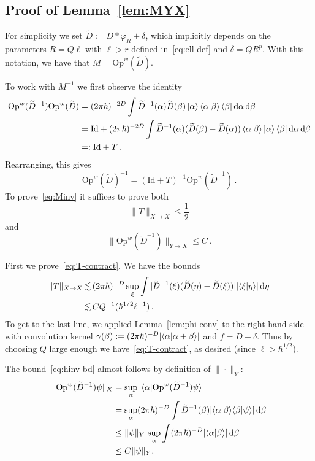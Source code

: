 \documentclass[11pt]{amsart}
\def\Op{\mathrm{Op}}
\def\Id{\mathrm{Id}}
\newcommand{\diff}{\mathop{}\!\mathrm{d}}
\def\lsim{{\,\lesssim\,}}
\def\bra#1{\mathinner{\langle{#1}|}}
\def\ket#1{\mathinner{|{#1}\rangle}}
\def\braket#1{\mathinner{\langle{#1}\rangle}}
\def\Braket#1{\!\mathinner{\langle{#1}\rangle}\!}
\numberwithin{equation}{section}
\begin{document}
\subsection{Proof of Lemma~\ref{lem:MYX}}
\label{sec:proofM}
For simplicity we set $\widetilde{D} := D\ast\varphi_{R} + \delta$, which implicitly depends on the
parameters $R=Q\ell$ with $\ell > r$ defined in~\eqref{eq:ell-def}
and $\delta = QR^p$.  With this notation, we have that $M = \Op^w(\widetilde{D})$.

To work with $M^{-1}$ we first observe the identity
\begin{align*}
\Op^w(\widetilde{D}^{-1})\Op^w(\widetilde{D})
&= (2\pi\hbar)^{-2D}\int \widetilde{D}^{-1}(\alpha) \widetilde{D}(\beta) \ket{\alpha}\braket{\alpha|\beta}\bra{\beta} \diff \alpha\diff\beta \\
&= \Id + (2\pi \hbar)^{-2D} \int \widetilde{D}^{-1}(\alpha) (\widetilde{D}(\beta)-\widetilde{D}(\alpha)) \braket{\alpha|\beta} \ket{\alpha}\bra{\beta}\diff\alpha\diff\beta \\
&=: \Id + T\,.
\end{align*}
Rearranging, this gives
\[
\Op^w(\widetilde{D})^{-1} = (\Id+T)^{-1}  \Op^w(\widetilde{D}^{-1})\,.
\]
To prove~\eqref{eq:Minv} it suffices to prove both
\begin{equation}
\label{eq:T-contract}
\|T\|_{X\to X} \leq \frac12
\end{equation}
and
\begin{equation}
\label{eq:hinv-bd}
\|\Op^w(\widetilde{D}^{-1})\|_{Y\to X} \leq C\,.
\end{equation}

First we prove~\eqref{eq:T-contract}.  We have the bounds
\begin{align*}
\|T\|_{X\to X}
&\lsim (2\pi\hbar)^{-D} \sup_\xi \int |\widetilde{D}^{-1}(\xi) (\widetilde{D}(\eta)-\widetilde{D}(\xi))| |\Braket{\xi|\eta}|\diff\eta \\
&\lsim C Q^{-1} (\hbar^{1/2} \ell^{-1})\,.
\end{align*}
To get to the last line, we applied
Lemma~\ref{lem:phi-conv} to the right hand side with convolution kernel
$\gamma(\beta) := (2\pi\hbar)^{-D} |\Braket{\alpha|\alpha+\beta}|$ and $f = D + \delta$.  Thus
by choosing $Q$ large enough we have~\eqref{eq:T-contract}, as desired (since $\ell>\hbar^{1/2}$).

The bound~\eqref{eq:hinv-bd} almost follows by definition of $\|\cdot\|_Y$:
\begin{align*}
\|\Op^w(\widetilde{D}^{-1})\psi\|_X
&= \sup_\alpha |\Braket{\alpha|\Op^w(\widetilde{D}^{-1})\psi}| \\
&= \sup_\alpha (2\pi\hbar)^{-D} \int \widetilde{D}^{-1}(\beta)
|\Braket{\alpha|\beta}\,\Braket{\beta|\psi}| \diff \beta \\
&\leq \|\psi\|_Y \,\sup_\alpha \int (2\pi\hbar)^{-D} |\Braket{\alpha|\beta}|\diff\beta \\
&\leq C \|\psi\|_Y.
\end{align*}
\end{document}
